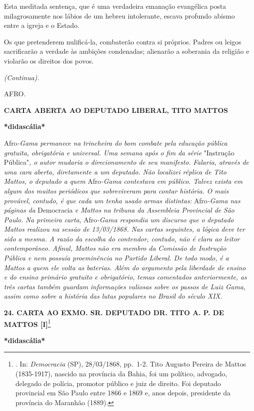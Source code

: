 Esta meditada sentença, que é uma verdadeira emanação evangélica posta
milagrosamente nos lábios de um hebreu intolerante, escava profundo
abismo entre a igreja e o Estado.

Os que pretenderem nulificá-la, combaterão contra si próprios. Padres ou
leigos sacrificarão a verdade às ambições condenadas; alienarão a
soberania da religião e violarão os direitos dos povos.

\emph{(Continua).}

AFRO.

\textbf{CARTA ABERTA AO DEPUTADO LIBERAL, TITO MATTOS}

\textbf{*didascália*}

Afro\emph{-Gama permanece na trincheira do bom combate pela educação
pública gratuita, obrigatória e universal. Uma semana após o fim da
série} "Instrução Pública"\emph{, o autor mudaria o direcionamento de
seu manifesto. Falaria, através de uma cara aberta, diretamente a um
deputado. Não localizei réplica de Tito Mattos, o deputado a quem}
Afro\emph{-Gama contestava em público. Talvez exista em algum dos muitos
periódicos que sobreviveram para contar história. O mais provável,
contudo, é que cada um tenha usado armas distintas:} Afro\emph{-Gama nas
páginas da} Democracia \emph{e Mattos na tribuna da Assembleia
Provincial de São Paulo. Na primeira carta,} Afro\emph{-Gama respondia
um discurso que o deputado Mattos realizou na sessão de 13/03/1868. Nas
cartas seguintes, a lógica deve ter sido a mesma. A razão da escolha do
contendor, contudo, não é clara ao leitor contemporâneo. Afinal, Mattos
não era membro da Comissão de Instrução Pública e nem possuía
proeminência no Partido Liberal. De todo modo, é a Mattos a quem ele
volta as baterias. Além do argumento pela liberdade de ensino e do
ensino primário gratuito e obrigatório, temas comentados anteriormente,
as três cartas também guardam informações valiosas sobre os passos de
Luiz Gama, assim como sobre a história das lutas populares no Brasil do
século XIX.}

\textbf{24. CARTA AO EXMO. SR. DEPUTADO DR. TITO A. P. DE MATTOS
{[}I{]}}\footnote{. In: \emph{Democracia} (SP), 28/03/1868, pp.~1-2.
  Tito Augusto Pereira de Mattos (1835-1917), nascido na província da
  Bahia, foi um político, advogado, delegado de polícia, promotor
  público e juiz de direito. Foi deputado provincial em São Paulo entre
  1866 e 1869 e, anos depois, presidente da província do Maranhão
  (1889).}

\textbf{*didascália*}

